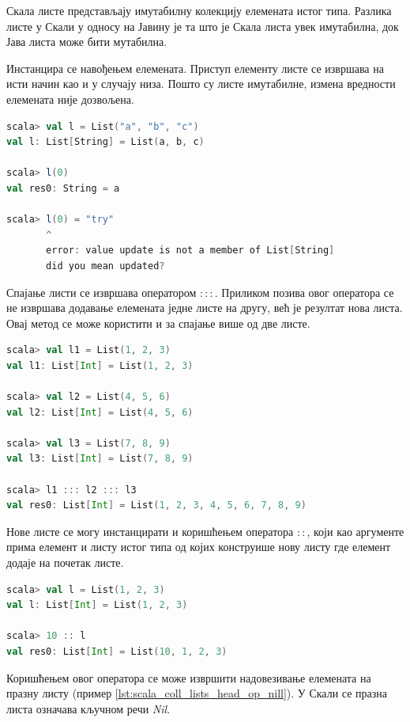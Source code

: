 \documentclass[12pt,oneside]{memoir}
\begin{document}
Скала листе представљају имутабилну колекцију елемената истог типа. Разлика листе у Скали у односу на Јавину је та што је Скала листа увек имутабилна, док Јава листа може бити мутабилна. 

Инстанцира се навођењем елемената. Приступ елементу листе се извршава на исти начин као и у случају низа. Пошто су листе имутабилне, измена вредности елемената није дозвољена. \cite{scala_prog}

\begin{lstlisting}[language=Scala, caption={Пример Скала листе}, label={lst:scala_coll_lists_example}]
scala> val l = List("a", "b", "c")
val l: List[String] = List(a, b, c)

scala> l(0)
val res0: String = a

scala> l(0) = "try"
       ^
       error: value update is not a member of List[String]
       did you mean updated?
\end{lstlisting}

Спајање листи се извршава оператором $:::$. Приликом позива овог оператора се не извршава додавање елемената једне листе на другу, већ је резултат нова листа. Овај метод се може користити и за спајање више од две листе. \cite{scala_prog}

\begin{lstlisting}[language=Scala, caption={Спајање листи}, label={lst:scala_coll_lists_new_list}]
scala> val l1 = List(1, 2, 3)
val l1: List[Int] = List(1, 2, 3)

scala> val l2 = List(4, 5, 6)
val l2: List[Int] = List(4, 5, 6)

scala> val l3 = List(7, 8, 9)
val l3: List[Int] = List(7, 8, 9)

scala> l1 ::: l2 ::: l3
val res0: List[Int] = List(1, 2, 3, 4, 5, 6, 7, 8, 9)
\end{lstlisting}

Нове листе се могу инстанцирати и коришћењем оператора $::$, који као аргументе прима елемент и листу истог типа од којих конструише нову листу где елемент додаје на почетак листе.

\begin{lstlisting}[language=Scala, caption={Пример оператора ::}, label={lst:scala_coll_lists_head_op}]
scala> val l = List(1, 2, 3)
val l: List[Int] = List(1, 2, 3)

scala> 10 :: l
val res0: List[Int] = List(10, 1, 2, 3)
\end{lstlisting}

Коришћењем овог оператора се може извршити надовезивање елемената на празну листу (пример \ref{lst:scala_coll_lists_head_op_nill}). У Скали се празна листа означава кључном речи \textit{Nil}.
\end{document}
